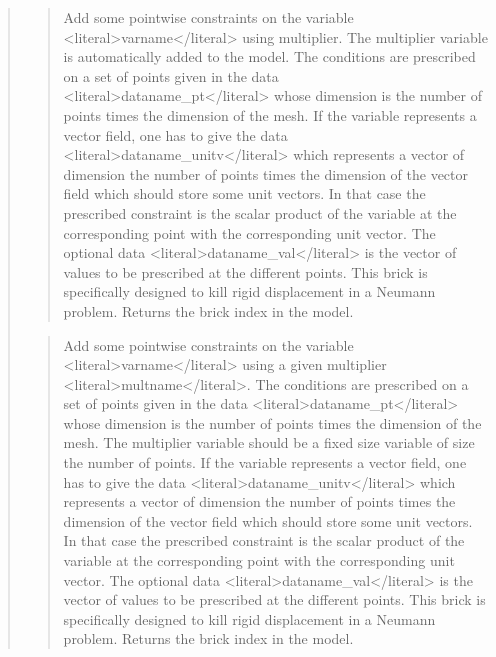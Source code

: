 \documentclass[a4paper,11pt,english]{sphinxmanual}
\begin{document}
\begin{quote}
\begin{quote}
\sphinxAtStartPar
Add some pointwise constraints on the variable \textless{}literal\textgreater{}varname\textless{}/literal\textgreater{} using
multiplier. The multiplier variable is automatically added to the model.
The conditions are prescribed on a set of points given in the data
\textless{}literal\textgreater{}dataname\_pt\textless{}/literal\textgreater{} whose dimension is the number of points times the dimension
of the mesh.
If the variable represents a vector field, one has to give the data
\textless{}literal\textgreater{}dataname\_unitv\textless{}/literal\textgreater{} which represents a vector of dimension the number of
points times the dimension of the vector field which should store some
unit vectors. In that case the prescribed constraint is the scalar
product of the variable at the corresponding point with the corresponding
unit vector.
The optional data \textless{}literal\textgreater{}dataname\_val\textless{}/literal\textgreater{} is the vector of values to be prescribed
at the different points.
This brick is specifically designed to kill rigid displacement
in a Neumann problem.
Returns the brick index in the model.
\end{quote}

\sphinxAtStartPar
{}
\begin{quote}

\sphinxAtStartPar
Add some pointwise constraints on the variable \textless{}literal\textgreater{}varname\textless{}/literal\textgreater{} using a given
multiplier \textless{}literal\textgreater{}multname\textless{}/literal\textgreater{}.
The conditions are prescribed on a set of points given in the data
\textless{}literal\textgreater{}dataname\_pt\textless{}/literal\textgreater{} whose dimension is the number of points times the dimension
of the mesh.
The multiplier variable should be a fixed size variable of size the
number of points.
If the variable represents a vector field, one has to give the data
\textless{}literal\textgreater{}dataname\_unitv\textless{}/literal\textgreater{} which represents a vector of dimension the number of
points times the dimension of the vector field which should store some
unit vectors. In that case the prescribed constraint is the scalar
product of the variable at the corresponding point with the corresponding
unit vector.
The optional data \textless{}literal\textgreater{}dataname\_val\textless{}/literal\textgreater{} is the vector of values to be prescribed
at the different points.
This brick is specifically designed to kill rigid displacement
in a Neumann problem.
Returns the brick index in the model.
\end{quote}


\end{quote}
\end{document}
